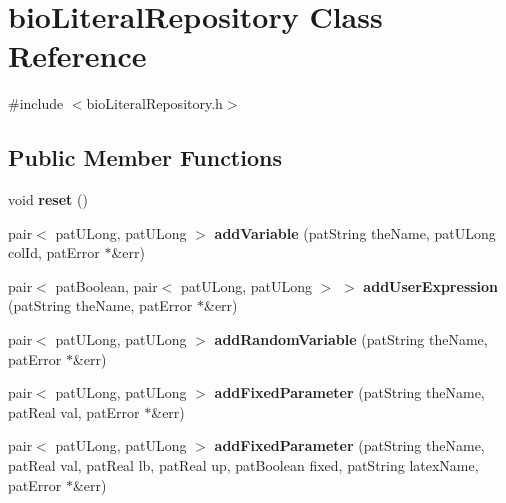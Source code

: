 \hypertarget{classbio_literal_repository}{}\section{bio\+Literal\+Repository Class Reference}
\label{classbio_literal_repository}


{\ttfamily \#include $<$bio\+Literal\+Repository.\+h$>$}

\subsection*{Public Member Functions}
\begin{DoxyCompactItemize}
\item 
\mbox{\label{classbio_literal_repository_a5eae3679ee4d9411177b6f0f64e17185}} 
void {\bfseries reset} ()
\item 
\mbox{\label{classbio_literal_repository_a25012b359d71de94f5bdd10fb36ece1b}} 
pair$<$ pat\+U\+Long, pat\+U\+Long $>$ {\bfseries add\+Variable} (pat\+String the\+Name, pat\+U\+Long col\+Id, pat\+Error $\ast$\&err)
\item 
\mbox{\label{classbio_literal_repository_ac4e48ad7678c27db871bb8ee75bdc6b1}} 
pair$<$ pat\+Boolean, pair$<$ pat\+U\+Long, pat\+U\+Long $>$ $>$ {\bfseries add\+User\+Expression} (pat\+String the\+Name, pat\+Error $\ast$\&err)
\item 
\mbox{\label{classbio_literal_repository_ab02b1fb2d3c4638c06f58f9d1b3e5356}} 
pair$<$ pat\+U\+Long, pat\+U\+Long $>$ {\bfseries add\+Random\+Variable} (pat\+String the\+Name, pat\+Error $\ast$\&err)
\item 
\mbox{\label{classbio_literal_repository_a4cfbfafb199abcd879f99b66a6c1a61f}} 
pair$<$ pat\+U\+Long, pat\+U\+Long $>$ {\bfseries add\+Fixed\+Parameter} (pat\+String the\+Name, pat\+Real val, pat\+Error $\ast$\&err)
\item 
\mbox{\label{classbio_literal_repository_a330c0a18d32d6f7d6bf1396c66285abb}} 
pair$<$ pat\+U\+Long, pat\+U\+Long $>$ {\bfseries add\+Fixed\+Parameter} (pat\+String the\+Name, pat\+Real val, pat\+Real lb, pat\+Real up, pat\+Boolean fixed, pat\+String latex\+Name, pat\+Error $\ast$\&err)

\end{DoxyCompactItemize}
